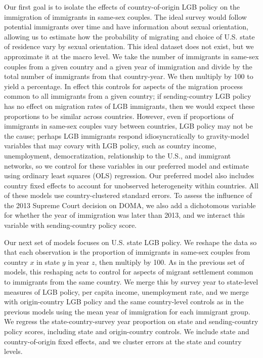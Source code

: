 \documentclass[
  11pt,
]{article}
\begin{document}
Our first goal is to isolate the effects of country-of-origin LGB policy on the immigration of immigrants in same-sex couples. The ideal survey would follow potential immigrants over time and have information about sexual orientation, allowing us to estimate how the probability of migrating and choice of U.S. state of residence vary by sexual orientation. This ideal dataset does not exist, but we approximate it at the macro level. We take the number of immigrants in same-sex couples from a given country and a given year of immigration and divide by the total number of immigrants from that country-year. We then multiply by 100 to yield a percentage. In effect this controls for aspects of the migration process common to all immigrants from a given country; if sending-country LGB policy has no effect on migration rates of LGB immigrants, then we would expect these proportions to be similar across countries. However, even if proportions of immigrants in same-sex couples vary between countries, LGB policy may not be the cause; perhaps LGB immigrants respond idiosyncratically to gravity-model variables that may covary with LGB policy, such as country income, unemployment, democratization, relationship to the U.S., and immigrant networks, so we control for these variables in our preferred model and estimate using ordinary least squares (OLS) regression. Our preferred model also includes country fixed effects to account for unobserved heterogeneity within countries. All of these models use country-clustered standard errors. To assess the influence of the 2013 Supreme Court decision on DOMA, we also add a dichotomous variable for whether the year of immigration was later than 2013, and we interact this variable with sending-country policy score.

Our next set of models focuses on U.S. state LGB policy. We reshape the data so that each observation is the proportion of immigrants in same-sex couples from country \(x\) in state \(y\) in year \(z\), then multiply by 100. As in the previous set of models, this reshaping acts to control for aspects of migrant settlement common to immigrants from the same country. We merge this by survey year to state-level measures of LGB policy, per capita income, unemployment rate, and we merge with origin-country LGB policy and the same country-level controls as in the previous models using the mean year of immigration for each immigrant group. We regress the state-country-survey year proportion on state and sending-country policy scores, including state and origin-country controls. We include state and country-of-origin fixed effects, and we cluster errors at the state and country levels.
\end{document}
